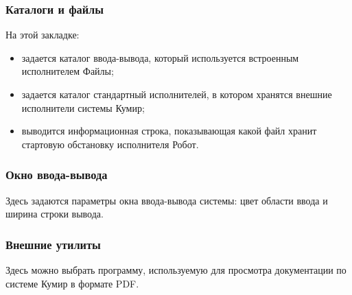 \documentclass[12pt,a4paper]{article}
\begin{document}
\subsubsection{Каталоги и файлы}

На этой закладке:
\begin{itemize}
\item задается каталог ввода-вывода, который используется встроенным исполнителем \textsf{\mbox{Файлы}};
\item задается каталог стандартный исполнителей, в котором хранятся внешние исполнители системы Кумир;
\item выводится информационная строка, показывающая какой файл хранит стартовую обстановку исполнителя \textsf{Робот}.
\end{itemize}

\subsubsection{Окно ввода-вывода}

Здесь задаются параметры окна ввода-вывода системы: цвет области ввода и ширина строки вывода.

\subsubsection{Внешние утилиты}

Здесь можно выбрать программу, используемую для просмотра документации по системе Кумир в формате PDF.

\printindex
\end{document}
